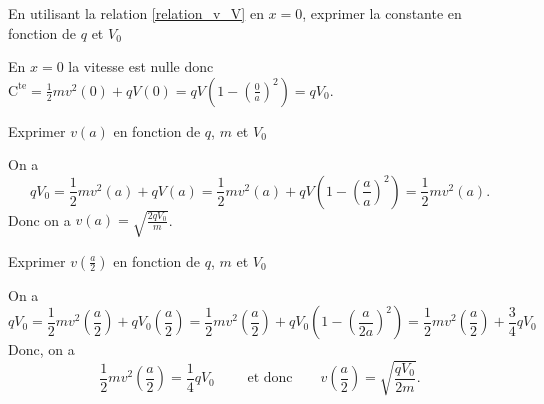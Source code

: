 
\begin{enonce}
	En utilisant la relation \eqref{relation_v_V} en $x=0$, exprimer la constante en fonction de $q$ et $V_0$
\end{enonce}


\begin{corrige}
	En $x=0$ la vitesse est nulle donc $
		\mathrm{C^{te}} = \frac{1}{2}mv^2(0) + qV(0) = qV \left( 1 - \left(\frac{0}{a}\right)^2\right) 
		= qV_0$.
\end{corrige}



\hauteurLargeurCadreReponse		{8mm}{4cm}



\begin{enonce}
	Exprimer $v(a)$ en fonction de $q$, $m$ et $V_0$
\end{enonce}
	
	
\begin{corrige}
	On a
	\[
	qV_0 = \frac{1}{2}mv^2(a) + qV(a) = \frac{1}{2}mv^2(a) + qV\left( 1 - \left(\frac{a}{a}\right)^2\right) = \frac{1}{2}mv^2(a).
	\]
	Donc on a $v(a) = \sqrt{\frac{2qV_0}{m}}$.
\end{corrige}






\begin{enonce}
	Exprimer $v\left(\frac{a}{2}\right)$ en fonction de $q$, $m$ et $V_0$
\end{enonce}
	
	
\begin{corrige}
On a 
	\[
		qV_0 = \frac{1}{2}mv^2\left(\frac{a}{2}\right) + qV_0\left(\frac{a}{2}\right) = \frac{1}{2}mv^2\left(\frac{a}{2}\right) + qV_0\left( 1 - \left(\frac{a}{2a}\right)^2\right) = \frac{1}{2}mv^2\left(\frac{a}{2}\right) +  \frac{3}{4}qV_0
	\]
	Donc, on a
	\[
		\frac{1}{2}mv^2\left(\frac{a}{2}\right) = \frac{1}{4}qV_0 \qquad \text{ et donc} \qquad	v\left(\frac{a}{2}\right) = \sqrt{\frac{qV_0}{2m}}.
	\]
\end{corrige}

